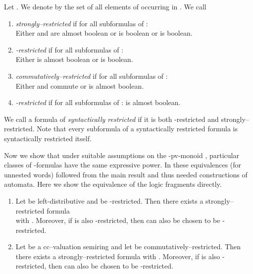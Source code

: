 \documentclass[runningheads, envcountsame, a4paper]{llncs}
\begin{document}
\begin{Def}Let . We denote by  the set of all elements of  occurring in . We call 
	\begin{enumerate}
		\item \emph{strongly--restricted} if for all subformulas  of : \\
		Either  and  are almost boolean or  is boolean or  is boolean.
		\item \emph{-restricted} if for all subformulas  of : \\
 		Either  is almost boolean or  is boolean.
		\item \emph{commutatively--restricted} if for all subformulas  of : \\
 		Either  and  commute or  is almost boolean. \item \emph{-restricted} if for all subformulas  of :  is almost boolean.
	\end{enumerate}
\end{Def}
We call a formula of  \emph{syntactically restricted} if it is both -restricted and strongly--restricted. Note that every subformula of a syntactically restricted formula is syntactically restricted itself.
~\par
Now we show that under suitable assumptions on the -pv-monoid , particular classes of -formulas have the same expressive power. In \cite{DM} these equivalences (for unnested words) followed from the main result and thus needed constructions of automata. Here we show the equivalence of the logic fragments directly.
\begin{Theorem}
	\label{thm:restrict}
	\begin{enumerate}[\quad(a)]
		\item Let  be left-distributive and  be -restricted. Then there exists a strongly--restricted formula \\  with . Moreover, if  is also -restricted, then  can also be chosen to be -restricted.
		\item Let  be a cc--valuation semiring and let  be commutatively--restricted. Then there exists a strongly--restricted formula
 with . Moreover, if  is also -restricted, then  can also be chosen to be -restricted.
	\end{enumerate}
\end{Theorem}
\end{document}
